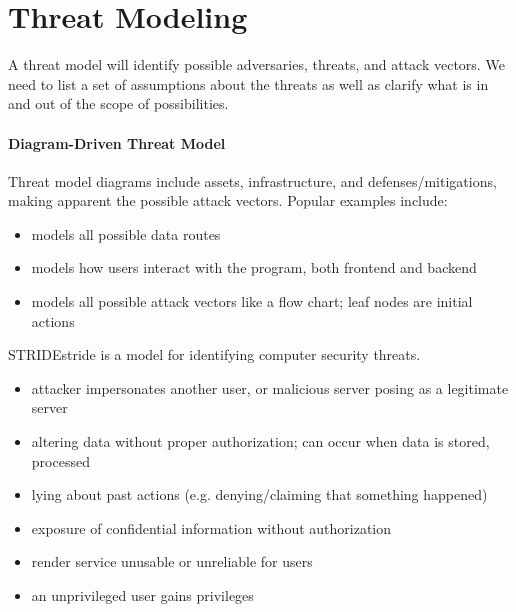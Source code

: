 \documentclass[code]{amznotes}
\begin{document}
\section{Threat Modeling}
A threat model will identify possible adversaries, threats, and attack vectors. We need to list a set of assumptions about the threats as well as clarify what is in and out of the scope of possibilities.

\paragraph{Diagram-Driven Threat Model}
Threat model diagrams include assets, infrastructure, and defenses/mitigations, making apparent the possible attack vectors. Popular examples include:
\begin{itemize}[noitemsep]
    \item {} models all possible data routes
    \item {} models how users interact with the program, both frontend and backend
    \item {} models all possible attack vectors like a flow chart; leaf nodes are initial actions
\end{itemize}

\begin{dfnbox}{STRIDE}{stride}
     is a model for identifying computer security threats.
    \begin{itemize}[noitemsep]
        \item {} attacker impersonates another user, or malicious server posing as a legitimate server
        \item {} altering data without proper authorization; can occur when data is stored, processed
        \item {} lying about past actions (e.g. denying/claiming that something happened)
        \item {} exposure of confidential information without authorization
        \item {} render service unusable or unreliable for users
        \item {} an unprivileged user gains privileges
    \end{itemize}
\end{dfnbox}
\end{document}
